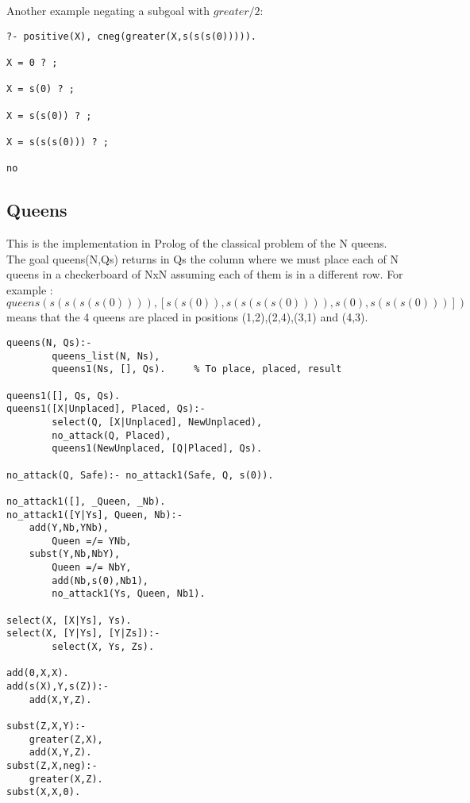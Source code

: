 \documentclass{tlp}
\begin{document}
Another example negating a subgoal with $greater/2$:
\begin{small}
\begin{verbatim}
?- positive(X), cneg(greater(X,s(s(s(0))))).

X = 0 ? ;

X = s(0) ? ;

X = s(s(0)) ? ;

X = s(s(s(0))) ? ;

no
\end{verbatim}
\end{small}

\subsection*{Queens}

This is the implementation in Prolog of the classical problem of the N
queens. The goal queens(N,Qs) returns in Qs the column where we must place
each of N queens in a checkerboard of NxN assuming each of them is in a
different row. For example :
$queens(s(s(s(s(0)))),[s(s(0)),s(s(s(s(0)))),s(0),s(s(s(0)))])$ means that the
4 queens are placed in positions (1,2),(2,4),(3,1) and (4,3).

\begin{small}
\begin{verbatim}
queens(N, Qs):-
        queens_list(N, Ns),
        queens1(Ns, [], Qs).     % To place, placed, result

queens1([], Qs, Qs).
queens1([X|Unplaced], Placed, Qs):-
        select(Q, [X|Unplaced], NewUnplaced),
        no_attack(Q, Placed),
        queens1(NewUnplaced, [Q|Placed], Qs).
 
no_attack(Q, Safe):- no_attack1(Safe, Q, s(0)). 
 
no_attack1([], _Queen, _Nb).
no_attack1([Y|Ys], Queen, Nb):-
	add(Y,Nb,YNb),
        Queen =/= YNb,
 	subst(Y,Nb,NbY),
        Queen =/= NbY,
        add(Nb,s(0),Nb1),
        no_attack1(Ys, Queen, Nb1).

select(X, [X|Ys], Ys).
select(X, [Y|Ys], [Y|Zs]):-
        select(X, Ys, Zs).

add(0,X,X).
add(s(X),Y,s(Z)):-
	add(X,Y,Z).

subst(Z,X,Y):-
	greater(Z,X),
	add(X,Y,Z).
subst(Z,X,neg):-
	greater(X,Z).
subst(X,X,0).
\end{verbatim}
\end{small}
\end{document}
